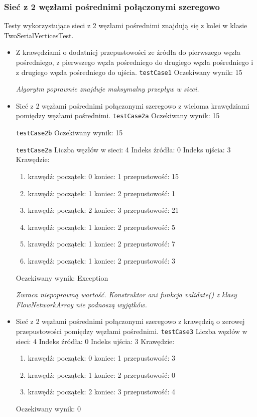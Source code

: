 \subsubsection{Sieć z 2 węzłami pośrednimi połączonymi szeregowo}
Testy wykorzystujące sieci z 2 węzłami pośrednimi znajdują się z kolei w klasie
TwoSerialVerticesTest.
\begin{itemize}[nosep]
    \item Z krawędziami o dodatniej przepustowości ze źródła do pierwszego węzła
    pośredniego, z pierwszego węzła pośredniego do drugiego węzła pośredniego i z
    drugiego węzła pośredniego do ujścia.
    \texttt{testCase1}
    Oczekiwany wynik: 15

    \emph{Algorytm poprawnie znajduje maksymalny przepływ w sieci.}

    \item Sieć z 2 węzłami pośrednimi połączonymi szeregowo z wieloma
    krawędziami pomiędzy węzłami pośrednimi.
    \texttt{testCase2a}
    Oczekiwany wynik: 15

    \texttt{testCase2b}
    Oczekiwany wynik: 15

    \texttt{testCase2a}
    Liczba węzłów w sieci: 4
    Indeks źródła: 0
    Indeks ujścia: 3
    Krawędzie:
    \begin{enumerate}[nosep]
        \item krawędź:
        początek: 0
        koniec: 1
        przepustowość: 15
        \item krawędź:
        początek: 1
        koniec: 2
        przepustowość: 1
        \item krawędź:
        początek: 2
        koniec: 3
        przepustowość: 21
        \item krawędź:
        początek: 1
        koniec: 2
        przepustowość: 5
        \item krawędź:
        początek: 1
        koniec: 2
        przepustowość: 7
        \item krawędź:
        początek: 1
        koniec: 2
        przepustowość: 3
    \end{enumerate}
    Oczekiwany wynik: Exception

    \emph{Zwraca niepoprawną wartość. Konstruktor ani funkcja validate() z klasy FlowNetworkArray nie podnoszą wyjątków.}

    \item Sieć z 2 węzłami pośrednimi połączonymi szeregowo z krawędzią o
    zerowej przepustowości pomiędzy węzłami pośrednimi.
    \texttt{testCase3}
    Liczba węzłów w sieci: 4
    Indeks źródła: 0
    Indeks ujścia: 3
    Krawędzie:
    \begin{enumerate}[nosep]
        \item krawędź:
        początek: 0
        koniec: 1
        przepustowość: 3
        \item krawędź:
        początek: 1
        koniec: 2
        przepustowość: 0
        \item krawędź:
        początek: 2
        koniec: 3
        przepustowość: 4
    \end{enumerate}
    Oczekiwany wynik: 0


\end{itemize}
